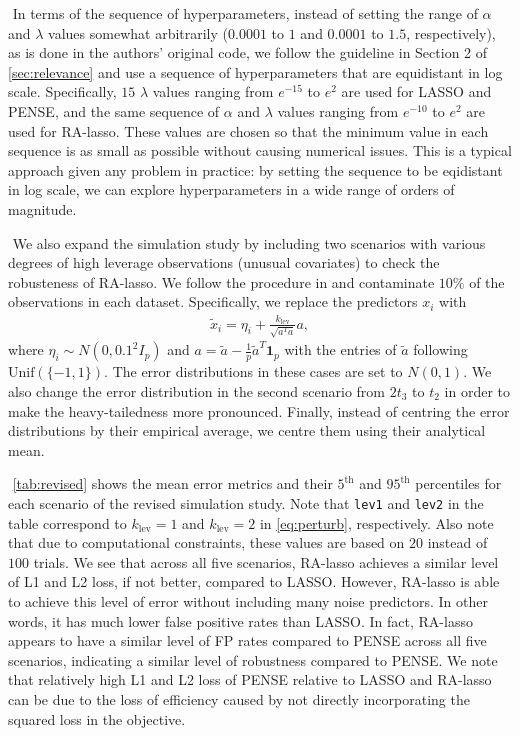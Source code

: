 $ $\newline
In terms of the sequence of hyperparameters, instead of setting the range of $\alpha$ and $\lambda$ values somewhat arbitrarily ($0.0001$ to $1$ and $0.0001$ to $1.5$, respectively), as is done in the authors' original code, we follow the guideline in Section 2 of \cref{sec:relevance} and use a sequence of hyperparameters that are equidistant in log scale. Specifically, $15$ $\lambda$ values ranging from $e^{-15}$ to $e^2$ are used for LASSO and PENSE, and the same sequence of $\alpha$ and $\lambda$ values ranging from $e^{-10}$ to $e^2$ are used for RA-lasso. These values are chosen so that the minimum value in each sequence is as small as possible without causing numerical issues. This is a typical approach given any problem in practice: by setting the sequence to be eqidistant in log scale, we can explore hyperparameters in a wide range of orders of magnitude.

$ $\newline
We also expand the simulation study by including two scenarios with various degrees of high leverage observations (unusual covariates) to check the robusteness of RA-lasso. We follow the procedure in \citet{maronna2011robust} and contaminate $10\%$ of the observations in each dataset. Specifically, we replace the predictors $x_i$ with
\begin{align}
\tilde{x}_i = \eta_i + \frac{k_\text{lev}}{\sqrt{a^Ta}}a, \label{eq:perturb}
\end{align}
where $\eta_i \sim N(0, 0.1^2I_p)$ and $a = \tilde{a} - \frac{1}{p}\tilde{a}^T\bm{1}_p$ with the entries of $\tilde{a}$ following $\text{Unif}(\{-1, 1\})$. The error distributions in these cases are set to $N(0,1)$. We also change the error distribution in the second scenario from $2t_3$ to $t_2$ in order to make the heavy-tailedness more pronounced. Finally, instead of centring the error distributions by their empirical average, we centre them using their analytical mean.

$ $\newline
\cref{tab:revised} shows the mean error metrics and their $5^\text{th}$ and $95^\text{th}$ percentiles for each scenario of the revised simulation study. Note that \texttt{lev1} and \texttt{lev2} in the table correspond to $k_\text{lev}=1$ and $k_\text{lev}=2$ in \cref{eq:perturb}, respectively. Also note that due to computational constraints, these values are based on $20$ instead of $100$ trials. We see that across all five scenarios, RA-lasso achieves a similar level of L1 and L2 loss, if not better, compared to LASSO. However, RA-lasso is able to achieve this level of error without including many noise predictors. In other words, it has much lower false positive rates than LASSO. In fact, RA-lasso appears to have a similar level of FP rates compared to PENSE across all five scenarios, indicating a similar level of robustness compared to PENSE. We note that relatively high L1 and L2 loss of PENSE relative to LASSO and RA-lasso can be due to the loss of efficiency caused by not directly incorporating the squared loss in the objective.
